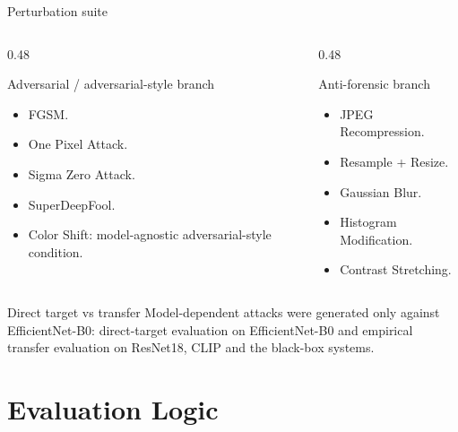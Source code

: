 \documentclass{beamer}
\begin{document}
\begin{frame}{Perturbation suite}

\small

\begin{columns}

\begin{column}{0.48\textwidth}
\begin{block}{Adversarial / adversarial-style branch}
\begin{itemize}
    \item FGSM.
    \item One Pixel Attack.
    \item Sigma Zero Attack.
    \item SuperDeepFool.
    \item Color Shift: model-agnostic adversarial-style condition.
\end{itemize}
\end{block}
\end{column}

\begin{column}{0.48\textwidth}
\begin{block}{Anti-forensic branch}
\begin{itemize}
    \item JPEG Recompression.
    \item Resample + Resize.
    \item Gaussian Blur.
    \item Histogram Modification.
    \item Contrast Stretching.
\end{itemize}
\end{block}
\end{column}

\end{columns}

\begin{block}{Direct target vs transfer}
Model-dependent attacks were generated only against EfficientNet-B0: direct-target evaluation on EfficientNet-B0 and empirical transfer evaluation on ResNet18, CLIP and the black-box systems.
\end{block}

\end{frame}

\section{Evaluation Logic}
\end{document}
